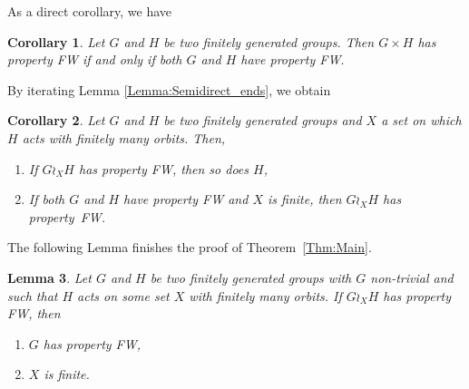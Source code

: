 \documentclass[a4paper]{article}
\newtheorem{lem}{Lemma}[section]
\newtheorem{cor}[lem]{Corollary}
\theoremstyle{definition}
\theoremstyle{remark}
\begin{document}
%
%
As a direct corollary, we have
\begin{cor}
Let $G$ and $H$ be two finitely generated groups. Then $G\times H$ has property FW if and only if both $G$ and $H$ have property FW.
\end{cor}
%
%
By iterating Lemma \ref{Lemma:Semidirect_ends}, we obtain
%
%
\begin{cor}\label{Cor:Wreath_ends}
Let $G$ and $H$ be two finitely generated groups and $X$ a set on which $H$ acts with finitely many orbits. Then,
\begin{enumerate}
\item
If $G\wr_X H$ has property FW, then so does $H$,
\item
If both $G$ and $H$ have property FW and $X$ is finite, then $G\wr_X H$ has property~FW.
\end{enumerate}
\end{cor}
%
%
The following Lemma finishes the proof of Theorem~\ref{Thm:Main}.
%
%
\begin{lem}\label{Lem:Wreath_groups_ends}
Let $G$ and $H$ be two finitely generated groups with $G$ non-trivial and such that $H$ acts on some set $X$ with finitely many orbits.
If $G\wr_XH$ has property FW, then
\begin{enumerate}
\item $G$ has property FW,
\item $X$ is finite.
\end{enumerate}
\end{lem}
%
%
\end{document}
